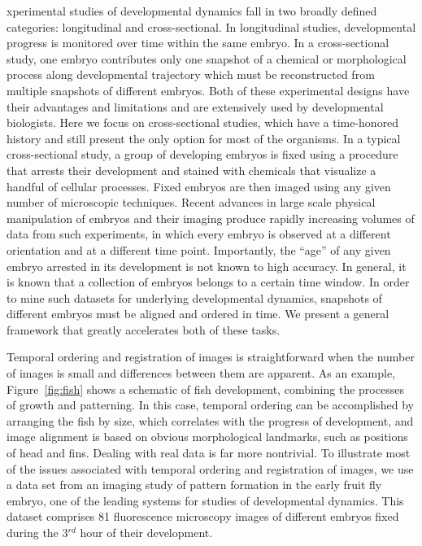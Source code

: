 \documentclass{pnastwo}
\begin{document}
\begin{article}
xperimental studies of developmental dynamics fall in two broadly defined categories: longitudinal and cross-sectional. In longitudinal studies, developmental progress is monitored over time within the same embryo. In a cross-sectional study, one embryo contributes only one snapshot of a chemical or morphological process along developmental trajectory which must be reconstructed from multiple snapshots of different embryos. Both of these experimental designs have their advantages and limitations and are extensively used by developmental biologists. Here we focus on cross-sectional studies, which have a time-honored history and still present the only option for most of the organisms. In a typical cross-sectional study, a group of developing embryos is fixed using a procedure that arrests their development and stained with chemicals that visualize a handful of cellular processes. Fixed embryos are then imaged using any given number of microscopic techniques. Recent advances in large scale physical manipulation of embryos and their imaging produce rapidly increasing volumes of data from such experiments, in which every embryo is observed at a different orientation and at a different time point. Importantly, the ``age'' of any given embryo arrested in its development is not known to high accuracy. In general, it is known that a collection of embryos belongs to a certain time window. In order to mine such datasets for underlying developmental dynamics, snapshots of different embryos must be aligned and ordered in time. We present a general framework that greatly accelerates both of these tasks.

Temporal ordering and registration of images is straightforward when the number of images is small and differences between them are apparent. As an example, Figure~\ref{fig:fish} shows a schematic of fish development, combining the processes of growth and patterning.  In this case, temporal ordering can be accomplished by arranging the fish by size, which correlates with the progress of development, and image alignment is based on obvious morphological landmarks, such as positions of head and fins. Dealing with real data is far more nontrivial. To illustrate most of the issues associated with temporal ordering and registration of images, we use a data set from an imaging study of pattern formation in the early fruit fly embryo, one of the leading systems for studies of developmental dynamics. This dataset comprises 81 fluorescence microscopy images of different embryos fixed during the 3$^{rd}$ hour of their development. 


\end{article}
\end{document}
